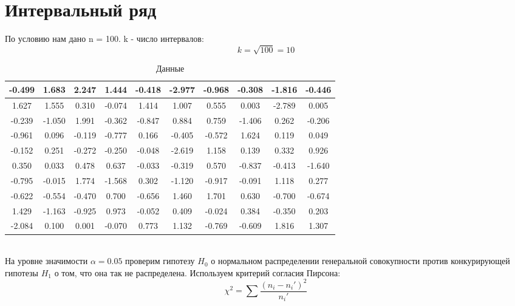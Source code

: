 \documentclass{article}
\begin{document}
\section{Интервальный ряд}
По условию нам дано n = 100. k - число интервалов:
\begin{equation*}
    k = \sqrt{100} = 10
\end{equation*}
\begin{table}[h]
    \centering
    \begin{tabular}{|*{10}{c|}}
        \hline
        -0.499 & 1.683 & 2.247 & 1.444 & -0.418 & -2.977 & -0.968 & -0.308 & -1.816 & -0.446 \\
        \hline
        1.627 & 1.555 & 0.310 & -0.074 & 1.414 & 1.007 & 0.555 & 0.003 & -2.789 & 0.005 \\
        \hline
        -0.239 & -1.050 & 1.991 & -0.362 & -0.847 & 0.884 & 0.759 & -1.406 & 0.262 & -0.206 \\
        \hline
        -0.961 & 0.096 & -0.119 & -0.777 & 0.166 & -0.405 & -0.572 & 1.624 & 0.119 & 0.049 \\
        \hline
        -0.152 & 0.251 & -0.272 & -0.250 & -0.048 & -2.619 & 1.158 & 0.139 & 0.332 & 0.926 \\
        \hline
        0.350 & 0.033 & 0.478 & 0.637 & -0.033 & -0.319 & 0.570 & -0.837 & -0.413 & -1.640 \\
        \hline
        -0.795 & -0.015 & 1.774 & -1.568 & 0.302 & -1.120 & -0.917 & -0.091 & 1.118 & 0.277 \\
        \hline
        -0.622 & -0.554 & -0.470 & 0.700 & -0.656 & 1.460 & 1.701 & 0.630 & -0.700 & -0.674 \\
        \hline
        1.429 & -1.163 & -0.925 & 0.973 & -0.052 & 0.409 & -0.024 & 0.384 & -0.350 & 0.203 \\
        \hline
        -2.084 & 0.100 & 0.001 & -0.070 & 0.773 & 1.132 & -0.769 & -0.609 & 1.816 & 1.307 \\
        \hline
    \end{tabular}
    \caption{Данные}
\end{table}
\\
На уровне значимости $\alpha = 0.05$ проверим гипотезу $H_0$ о нормальном распределении генеральной совокупности против конкурирующей гипотезы
$H_1$ о том, что она так не распределена. Используем критерий согласия Пирсона:
\[\chi^2 = \sum\frac{(n_i-n_i')^2}{n_i'}\]
\end{document}
